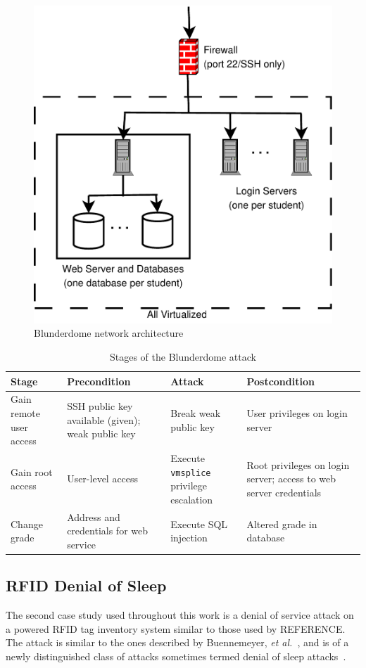 \begin{figure}
\centering
\includegraphics{blunderarch}
\caption{Blunderdome network architecture}
\label{fig:blunderarch}
\end{figure}

\begin{table}
\centering
\begin{tabular}{p{1.5in}|p{1in}|p{1in}|p{1in}}
Stage & Precondition	&	Attack	&	Postcondition \\ \hline \hline
Gain remote user access & SSH public key available (given); weak public key 
	& Break weak public key & User privileges on login server \\ \hline
Gain root access & User-level access & Execute \texttt{vmsplice} privilege escalation 
	& Root privileges on login server; access to web server credentials \\ \hline
Change grade & Address and credentials for web service & Execute SQL injection & Altered grade in database
\end{tabular}
\caption{Stages of the Blunderdome attack}
\label{table:blundertasks}
\end{table}
\subsection{RFID Denial of Sleep}
The second case study used throughout this work is a denial of service attack
on a powered RFID tag inventory system similar to those used by REFERENCE. The attack
is similar to the ones described by Buennemeyer, \emph{et al.}~\cite{buennemeyer2006battery},
and is of a newly distinguished class of attacks sometimes termed denial of sleep
attacks~\cite{brownfield2005wireless}.